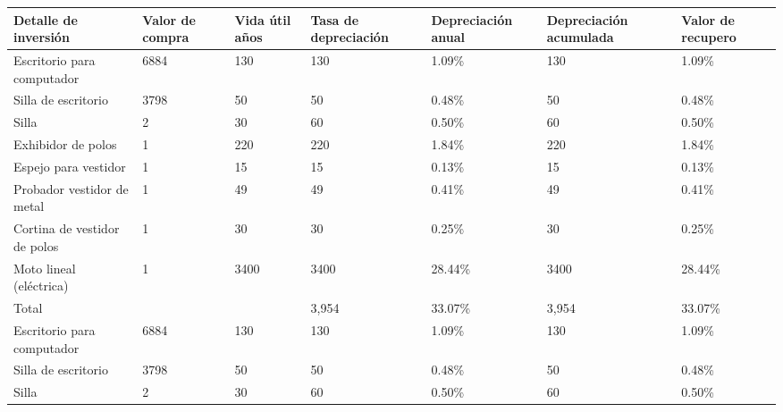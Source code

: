 \documentclass[a4paper,openright,12pt]{book}
\begin{document}
\begin{table}[H]
\centering
\resizebox{18cm}{!} {
\begin{tabular}{p{5cm}p{1.8cm}p{1.8cm}p{2.2cm}p{2.2cm}p{2.2cm}p{2.2cm}}
\hline
\textbf{Detalle de inversión} & \textbf{Valor de compra} & \textbf{Vida útil años} & \textbf{Tasa de depreciación} & \textbf{Depreciación anual} & \textbf{Depreciación acumulada} & \textbf{Valor de recupero}\\
\hline %
Escritorio para computador    &     6884          &     130                 &              130     & 1.09\%  &              130     & 1.09\% \\
Silla de escritorio           &     3798          &     50                  &              50      & 0.48\%  &              50      & 0.48\% \\
Silla                         &     2             &     30                  &              60      & 0.50\%  &              60      & 0.50\% \\
Exhibidor de polos            &     1             &     220                 &              220     & 1.84\%  &              220     & 1.84\%  \\
Espejo para vestidor          &     1             &     15                  &              15      & 0.13\%  &              15      & 0.13\% \\
Probador vestidor de metal    &     1             &     49                  &              49      & 0.41\%  &              49      & 0.41\% \\
Cortina de vestidor de polos  &     1             &     30                  &              30      & 0.25\%  &              30      & 0.25\%\\
Moto lineal (eléctrica)       &     1             &     3400                &              3400    & 28.44\% &              3400    & 28.44\% \\
Total                         &                   &	                        &             3,954    & 33.07\% &             3,954    & 33.07\%\\
Escritorio para computador    &     6884          &     130                 &              130     & 1.09\%  &              130     & 1.09\% \\
Silla de escritorio           &     3798          &     50                  &              50      & 0.48\%  &              50      & 0.48\% \\
Silla                         &     2             &     30                  &              60      & 0.50\%  &              60      & 0.50\% \\

\end{tabular}}
\end{table}
\end{document}
